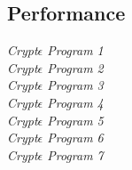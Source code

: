 \subsection{Performance}
\textit{Crypt$\epsilon$ Program 1}\\
\textit{Crypt$\epsilon$ Program 2}\\
\textit{Crypt$\epsilon$ Program 3}\\
\textit{Crypt$\epsilon$ Program 4}\\
\textit{Crypt$\epsilon$ Program 5}\\
\textit{Crypt$\epsilon$ Program 6}\\
\textit{Crypt$\epsilon$ Program 7}\\




